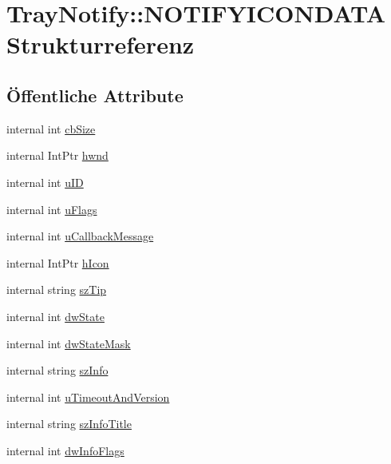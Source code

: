\hypertarget{structQbeTray_1_1TrayNotify_1_1NOTIFYICONDATA}{
\section{Tray\-Notify::NOTIFYICONDATA Strukturreferenz}
\label{structQbeTray_1_1TrayNotify_1_1NOTIFYICONDATA}
}
\subsection*{\"{O}ffentliche Attribute}
\begin{CompactItemize}
\item 
internal int \hyperlink{structQbeTray_1_1TrayNotify_1_1NOTIFYICONDATA_QbeTray_1_1TrayNotify_1_1NOTIFYICONDATAo0}{cb\-Size}
\item 
internal Int\-Ptr \hyperlink{structQbeTray_1_1TrayNotify_1_1NOTIFYICONDATA_QbeTray_1_1TrayNotify_1_1NOTIFYICONDATAo1}{hwnd}
\item 
internal int \hyperlink{structQbeTray_1_1TrayNotify_1_1NOTIFYICONDATA_QbeTray_1_1TrayNotify_1_1NOTIFYICONDATAo2}{u\-ID}
\item 
internal int \hyperlink{structQbeTray_1_1TrayNotify_1_1NOTIFYICONDATA_QbeTray_1_1TrayNotify_1_1NOTIFYICONDATAo3}{u\-Flags}
\item 
internal int \hyperlink{structQbeTray_1_1TrayNotify_1_1NOTIFYICONDATA_QbeTray_1_1TrayNotify_1_1NOTIFYICONDATAo4}{u\-Callback\-Message}
\item 
internal Int\-Ptr \hyperlink{structQbeTray_1_1TrayNotify_1_1NOTIFYICONDATA_QbeTray_1_1TrayNotify_1_1NOTIFYICONDATAo5}{h\-Icon}
\item 
internal string \hyperlink{structQbeTray_1_1TrayNotify_1_1NOTIFYICONDATA_QbeTray_1_1TrayNotify_1_1NOTIFYICONDATAo6}{sz\-Tip}
\item 
internal int \hyperlink{structQbeTray_1_1TrayNotify_1_1NOTIFYICONDATA_QbeTray_1_1TrayNotify_1_1NOTIFYICONDATAo7}{dw\-State}
\item 
internal int \hyperlink{structQbeTray_1_1TrayNotify_1_1NOTIFYICONDATA_QbeTray_1_1TrayNotify_1_1NOTIFYICONDATAo8}{dw\-State\-Mask}
\item 
internal string \hyperlink{structQbeTray_1_1TrayNotify_1_1NOTIFYICONDATA_QbeTray_1_1TrayNotify_1_1NOTIFYICONDATAo9}{sz\-Info}
\item 
internal int \hyperlink{structQbeTray_1_1TrayNotify_1_1NOTIFYICONDATA_QbeTray_1_1TrayNotify_1_1NOTIFYICONDATAo10}{u\-Timeout\-And\-Version}
\item 
internal string \hyperlink{structQbeTray_1_1TrayNotify_1_1NOTIFYICONDATA_QbeTray_1_1TrayNotify_1_1NOTIFYICONDATAo11}{sz\-Info\-Title}
\item 
internal int \hyperlink{structQbeTray_1_1TrayNotify_1_1NOTIFYICONDATA_QbeTray_1_1TrayNotify_1_1NOTIFYICONDATAo12}{dw\-Info\-Flags}
\end{CompactItemize}


